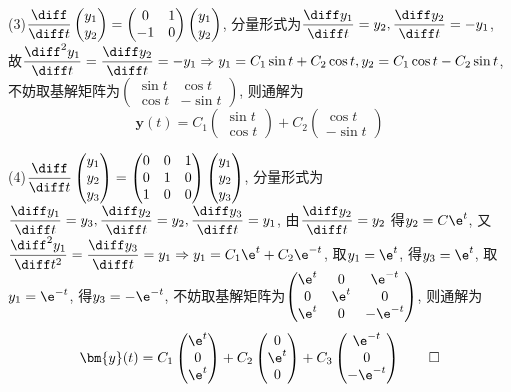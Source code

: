 \begin{solve}
(3)$\displaystyle\frac{\diff}{\diff t}\begin{pmatrix}y_1\\y_2\end{pmatrix}=\begin{pmatrix}0&1\\-1&0\end{pmatrix}\begin{pmatrix}y_1\\y_2\end{pmatrix}$, 
分量形式为$\displaystyle\frac{\diff y_1}{\diff t}=y_2,\frac{\diff y_2}{\diff t}=-y_1$, 
故$\displaystyle\frac{\diff^2y_1}{\diff t}=\frac{\diff y_2}{\diff t}=-y_1\Rightarrow y_1=C_1\sin t+C_2\cos t,y_2=C_1\cos t-C_2\sin t$, 
不妨取基解矩阵为$\begin{pmatrix}\sin t&\cos t\\\cos t&-\sin t\end{pmatrix}$, 则通解为
\[\bm{y}(t)=C_1\begin{pmatrix}\sin t\\\cos t\end{pmatrix}+C_2\begin{pmatrix}\cos t\\-\sin t\end{pmatrix}\]

(4)$\displaystyle\frac{\diff}{\diff t}\begin{pmatrix}y_1\\y_2\\y_3\end{pmatrix}=\begin{pmatrix}0&0&1\\0&1&0\\1&0&0\end{pmatrix}\begin{pmatrix}y_1\\y_2\\y_3\end{pmatrix}$, 
分量形式为$\displaystyle\frac{\diff y_1}{\diff t}=y_3,\frac{\diff y_2}{\diff t}=y_2,\frac{\diff y_3}{\diff t}=y_1$, 
由$\displaystyle\frac{\diff y_2}{\diff t}=y_2$
得$y_2=C\e^t$, 又$\displaystyle\frac{\diff^2y_1}{\diff t^2}=\frac{\diff y_3}{\diff t}=y_1\Rightarrow y_1=C_1\e^t+C_2\e^{-t}$, 
取$y_1=\e^t$, 得$y_3=\e^t$, 取$y_1=\e^{-t}$, 得$y_3=-\e^{-t}$, 
不妨取基解矩阵为$\begin{pmatrix}\e^t&0&\e^{-t}\\0&\e^t&0\\\e^t&0&-\e^{-t}\end{pmatrix}$, 则通解为
\[\bm{y}(t)=C_1\begin{pmatrix}\e^t\\0\\\e^t\end{pmatrix}+C_2\begin{pmatrix}0\\\e^t\\0\end{pmatrix}+C_3\begin{pmatrix}\e^{-t}\\0\\-\e^{-t}\end{pmatrix}\qedhere\]
\end{solve}


